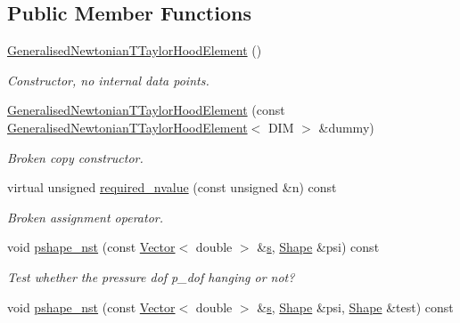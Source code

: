 \subsection*{Public Member Functions}
\begin{DoxyCompactItemize}
\item 
\hyperlink{classoomph_1_1GeneralisedNewtonianTTaylorHoodElement_a80cba811e2e40c7f6747749899f2773e}{Generalised\+Newtonian\+T\+Taylor\+Hood\+Element} ()
\begin{DoxyCompactList}\small\item\em Constructor, no internal data points. \end{DoxyCompactList}\item 
\hyperlink{classoomph_1_1GeneralisedNewtonianTTaylorHoodElement_a8efc8bf9d38227d7f8db4bb9fe5fdd38}{Generalised\+Newtonian\+T\+Taylor\+Hood\+Element} (const \hyperlink{classoomph_1_1GeneralisedNewtonianTTaylorHoodElement}{Generalised\+Newtonian\+T\+Taylor\+Hood\+Element}$<$ D\+IM $>$ \&dummy)
\begin{DoxyCompactList}\small\item\em Broken copy constructor. \end{DoxyCompactList}\item 
virtual unsigned \hyperlink{classoomph_1_1GeneralisedNewtonianTTaylorHoodElement_a6b113f1ccc3b67fe9f9deea3336fb126}{required\+\_\+nvalue} (const unsigned \&n) const
\begin{DoxyCompactList}\small\item\em Broken assignment operator. \end{DoxyCompactList}\item 
void \hyperlink{classoomph_1_1GeneralisedNewtonianTTaylorHoodElement_a6275b1519211476d13fcb08236def908}{pshape\+\_\+nst} (const \hyperlink{classoomph_1_1Vector}{Vector}$<$ double $>$ \&\hyperlink{cfortran_8h_ab7123126e4885ef647dd9c6e3807a21c}{s}, \hyperlink{classoomph_1_1Shape}{Shape} \&psi) const
\begin{DoxyCompactList}\small\item\em Test whether the pressure dof p\+\_\+dof hanging or not? \end{DoxyCompactList}\item 
void \hyperlink{classoomph_1_1GeneralisedNewtonianTTaylorHoodElement_a28c35b910b1c8f01677a7102c83ed94e}{pshape\+\_\+nst} (const \hyperlink{classoomph_1_1Vector}{Vector}$<$ double $>$ \&\hyperlink{cfortran_8h_ab7123126e4885ef647dd9c6e3807a21c}{s}, \hyperlink{classoomph_1_1Shape}{Shape} \&psi, \hyperlink{classoomph_1_1Shape}{Shape} \&test) const

\end{DoxyCompactItemize}

